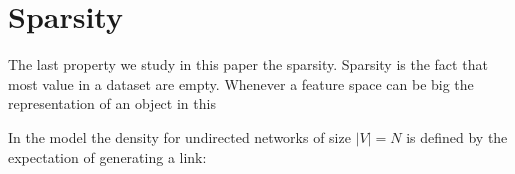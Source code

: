 \section{Sparsity}

The last property we study in this paper the sparsity. Sparsity is the fact that most value in a dataset are empty. Whenever a feature space can be big the representation of an object in this




In the model the density for undirected networks of size $|V|=N$ is defined by the expectation of generating a link:



